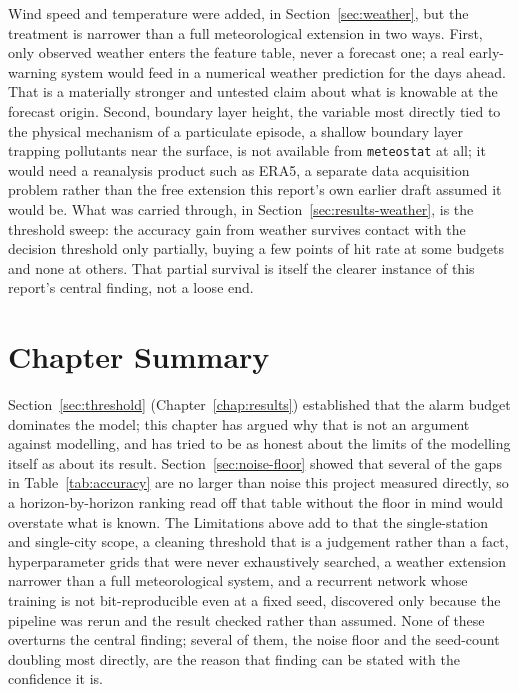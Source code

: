 \documentclass[12pt,a4paper]{report}
\begin{document}
Wind speed and temperature were added, in Section~\ref{sec:weather}, but the
treatment is narrower than a full meteorological extension in two ways.
First, only observed weather enters the feature table, never a forecast one;
a real early-warning system would feed in a numerical weather prediction for
the days ahead. That is a materially stronger and untested claim about what
is knowable at the forecast origin. Second, boundary layer height, the
variable most directly tied to the physical mechanism of a particulate
episode, a shallow boundary layer trapping pollutants near the surface, is
not available from \texttt{meteostat} at all; it would need a reanalysis
product such as ERA5, a separate data acquisition problem rather than the
free extension this report's own earlier draft assumed it would be. What was
carried through, in Section~\ref{sec:results-weather}, is the threshold
sweep: the accuracy gain from weather survives contact with the decision
threshold only partially, buying a few points of hit rate at some budgets
and none at others. That partial survival is itself the clearer instance of
this report's central finding, not a loose end.

\section{Chapter Summary}

Section~\ref{sec:threshold} (Chapter~\ref{chap:results}) established that the
alarm budget dominates the model; this chapter has argued why that is not an
argument against modelling, and has tried to be as honest about the limits of
the modelling itself as about its result. Section~\ref{sec:noise-floor} showed
that several of the gaps in Table~\ref{tab:accuracy} are no larger than noise
this project measured directly, so a horizon-by-horizon ranking read off that
table without the floor in mind would overstate what is known. The
Limitations above add to that the single-station and single-city scope, a
cleaning threshold that is a judgement rather than a fact, hyperparameter
grids that were never exhaustively searched, a weather extension narrower
than a full meteorological system, and a recurrent network whose training is
not bit-reproducible even at a fixed seed, discovered only because the
pipeline was rerun and the result checked rather than assumed. None of these
overturns the central finding; several of them, the noise floor and the
seed-count doubling most directly, are the reason that finding can be stated
with the confidence it is.
\end{document}
